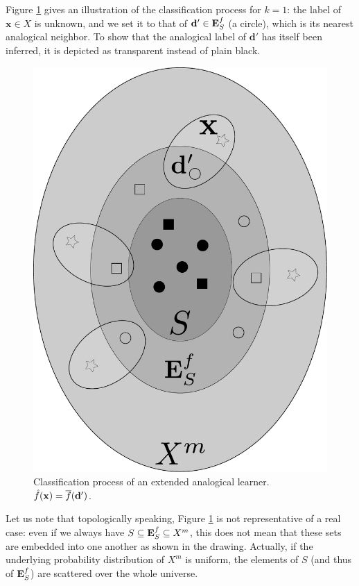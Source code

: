 Figure \ref{FIG:extended_classifier} gives an illustration of the classification process for
$k = 1$: the
label of $\mathbf{x} \in X$ is unknown, and we set it to that of $\mathbf{d}'
\in \mathbf{E}_{S}^{f}$ (a circle), which is its nearest analogical neighbor. To show that
the analogical label of $\mathbf{d}'$ has itself been inferred, it is depicted
as transparent instead of plain black.
\begin{figure}
\begin{center}
\includegraphics[scale=0.20]{figures/extended_classifier.pdf}
\end{center}
  \caption{Classification process of an extended analogical learner.
  $\hat{f}(\mathbf{x}) = \overline{f}(\mathbf{d}')$.}
\label{FIG:extended_classifier}
\end{figure}
Let us note that topologically speaking, Figure \ref{FIG:extended_classifier}
is not representative of a real case: even if we always have $S \subseteq \mathbf{E}_{S}^{f}
\subseteq X^m$, this does not mean that these sets are embedded into one
another as shown in the drawing. Actually, if the underlying probability
distribution of $X^m$ is uniform, the elements of $S$ (and thus of $\mathbf{E}_{S}^{f}$) are
scattered over the whole universe.


